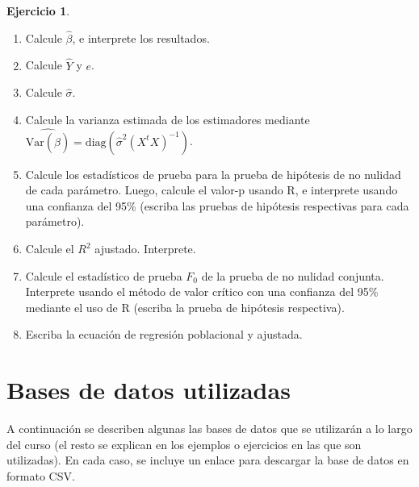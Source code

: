 \documentclass[
  11pt,
]{book}
\providecommand{\tightlist}{%
  \setlength{\itemsep}{0pt}\setlength{\parskip}{0pt}}
\theoremstyle{definition}
\theoremstyle{definition}
\theoremstyle{definition}
\newtheorem{exercise}{Ejercicio}[chapter]
\theoremstyle{definition}
\theoremstyle{remark}
\begin{document}
\begin{exercise}
\begin{enumerate}
\def\labelenumi{\arabic{enumi}.}
\tightlist
\item
  Calcule \(\widehat\beta\), e interprete los resultados.
\item
  Calcule \(\widehat{Y}\) y \(e\).
\item
  Calcule \(\widehat\sigma\).
\item
  Calcule la varianza estimada de los estimadores mediante \(\widehat{\mathrm{Var}(\hat{\beta})} = \text{diag}(\widehat\sigma^2 (X^tX)^{-1})\).
\item
  Calcule los estadísticos de prueba para la prueba de hipótesis de no nulidad de cada parámetro. Luego, calcule el valor-p usando R, e interprete usando una confianza del 95\% (escriba las pruebas de hipótesis respectivas para cada parámetro).
\item
  Calcule el \(R^2\) ajustado. Interprete.
\item
  Calcule el estadístico de prueba \(F_0\) de la prueba de no nulidad conjunta. Interprete usando el método de valor crítico con una confianza del 95\% mediante el uso de R (escriba la prueba de hipótesis respectiva).
\item
  Escriba la ecuación de regresión poblacional y ajustada.
\end{enumerate}

\end{exercise}

\chapter*{Bases de datos utilizadas}\label{bases-de-datos-utilizadas}

A continuación se describen algunas las bases de datos que se utilizarán a lo largo del curso (el resto se explican en los ejemplos o ejercicios en las que son utilizadas). En cada caso, se incluye un enlace para descargar la base de datos en formato CSV.
\end{document}
